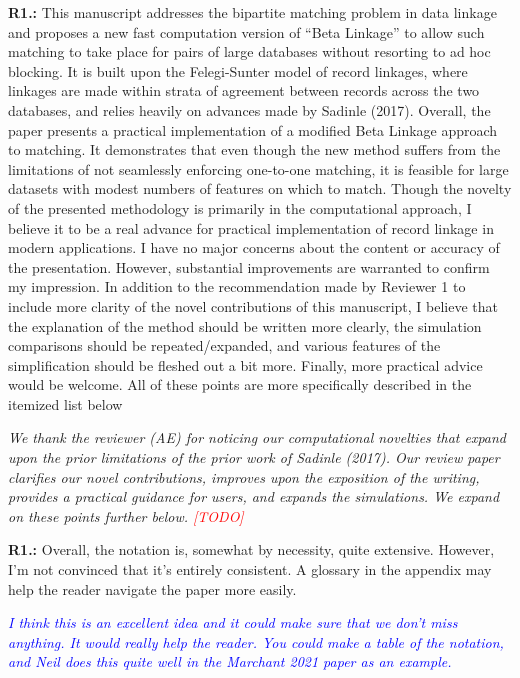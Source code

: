 \documentclass[letterpaper, parskip]{scrartcl}
\newcommand{\pointRaised}[2]{%
	\textbf{#1.\theresponsectr:} #2
}
\newcounter{responsectr}[section]     %
\newcommand{\reply}[1]{%
	\refstepcounter{responsectr}%
		\begin{tcolorbox}
			\itshape #1
		\end{tcolorbox}
}
\newcommand{\todo}{\textcolor{red}{[TODO]}\xspace}
\begin{document}
	
	\pointRaised{R1}{%
	This manuscript addresses the bipartite matching problem in data linkage and proposes a new fast
	computation version of “Beta Linkage” to allow such matching to take place for pairs of large databases
	without resorting to ad hoc blocking. It is built upon the Felegi-Sunter model of record linkages, where
	linkages are made within strata of agreement between records across the two databases, and relies
	heavily on advances made by Sadinle (2017).
	Overall, the paper presents a practical implementation of a modified Beta Linkage approach to
	matching. It demonstrates that even though the new method suffers from the limitations of not
	seamlessly enforcing one-to-one matching, it is feasible for large datasets with modest numbers of
	features on which to match. Though the novelty of the presented methodology is primarily in the
	computational approach, I believe it to be a real advance for practical implementation of record linkage
	in modern applications.
	I have no major concerns about the content or accuracy of the presentation. However, substantial
	improvements are warranted to confirm my impression. In addition to the recommendation made by
	Reviewer 1 to include more clarity of the novel contributions of this manuscript, I believe that the
	explanation of the method should be written more clearly, the simulation comparisons should be
	repeated/expanded, and various features of the simplification should be fleshed out a bit more. Finally,
	more practical advice would be welcome. All of these points are more specifically described in the
	itemized list below
	}
	
	\reply{%
	We thank the reviewer (AE) for noticing our computational novelties that expand upon the prior limitations of the prior work of Sadinle (2017). Our review paper clarifies our novel contributions, improves upon the exposition of the writing, provides a practical guidance for users, and expands the simulations. We expand on these points further below. \todo
	}
	
	
	\pointRaised{R1}{%
Overall, the notation is, somewhat by necessity, quite extensive. However, I’m not convinced that it’s entirely consistent. A glossary in the appendix may help the reader navigate the paper more easily.
            \reply{%
            \textcolor{blue}{I think this is an excellent idea and it could make sure that we don't miss anything. It would really help the reader. You could make a table of the notation, and Neil does this quite well in the Marchant 2021 paper as an example.}
            }


	}
\end{document}

